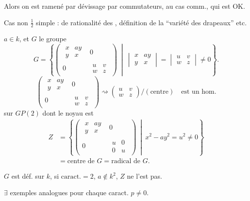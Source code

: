  Alors on est ramené par dévissage par commutateurs, au cas comm., qui est OK.




Cas non $\frac12$ simple :  de rationalité des , définition de la ``variété des drapeaux'' etc.



 $a\in k$, et $G$ le groupe
\[
G=\left\{\left(\begin{array}{cc}
\begin{matrix}x&ay\\y&x\end{matrix}&0\\
0&\begin{matrix}u&v\\w&z\end{matrix}
\end{array}\right)\ \middle|\ 
\begin{vmatrix}x&ay\\y&x\end{vmatrix}=\begin{vmatrix}u&v\\w&z\end{vmatrix}\ne0\right\}.
\]
\[
\left(\begin{array}{cc}
\begin{matrix}x&ay\\y&x\end{matrix}&0\\
0&\begin{matrix}u&v\\w&z\end{matrix}
\end{array}\right)\rightsquigarrow
\begin{pmatrix}u&v\\w&z\end{pmatrix}/(\text{centre})\quad\text{est un hom.}
\]
sur $GP(2)$ dont le noyau est
\[
\begin{aligned}
Z&=\left\{\left(\begin{array}{cc}
\begin{matrix}x&ay\\y&x\end{matrix}&0\\
0&\begin{matrix}u&0\\0&u\end{matrix}
\end{array}\right)\ \middle|\ x^2-ay^2=u^2\ne0\right\}\\
&=\text{centre de }G=\text{radical de }G.
\end{aligned}
\]

$G$ est déf. sur $k$,  si $\text{caract.}=2$, $a\notin k^2$, $Z$ ne l'est pas.

$\exists$ exemples analogues pour chaque caract. $p\ne0$.


